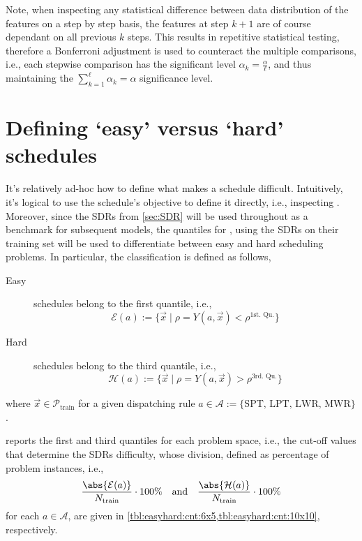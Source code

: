 Note, when inspecting any statistical difference between data distribution of the features on a step by step basis, the features at step $k+1$ are of course dependant on all previous $k$ steps. This results in repetitive statistical testing, therefore a Bonferroni adjustment is used to counteract the multiple comparisons, i.e., each stepwise comparison has the significant level $\alpha_k=\frac{\alpha}{\ell}$, and thus maintaining the $\sum_{k=1}^{\ell}\alpha_k=\alpha$ significance level.

\section{Defining `easy' versus `hard' schedules}\label{sec:diff:easyhard}
It's relatively ad-hoc how to define what makes a schedule difficult. Intuitively, it's logical to use the schedule's objective to define it directly, i.e., inspecting \fullnamerho. Moreover, since the SDRs from \cref{sec:SDR} will be used throughout as a benchmark for subsequent models, the quantiles for \namerho, using the SDRs on their training set will be used to differentiate between easy and hard scheduling problems. In particular, the classification is defined as follows, 
\begin{description}
	\item[Easy] schedules belong to the first quantile, i.e., \hfill \\
	\begin{equation}\label{eq:easy}
		\mathcal{E}(a):=\{\vec{x}\;|\;\rho=Y(a,\vec{x})<\rho^{\text{1st. Qu.}}\}
	\end{equation} 
	\item[Hard] schedules belong to the third quantile, i.e., \hfill \\
	\begin{equation}\label{eq:hard}
		\mathcal{H}(a):=\{\vec{x}\;|\;\rho=Y(a,\vec{x})>\rho^{\text{3rd. Qu.}}\}
	\end{equation} 
\end{description}
where $\vec{x}\in\mathcal{P}_{\text{train}}$ for a given dispatching rule $a\in\mathcal{A}:=\{\text{SPT,~LPT,~LWR,~MWR}\}$.

 reports the first and third quantiles for each problem space, i.e., the cut-off values that determine the SDRs difficulty, whose division, defined as percentage of problem instances, i.e., 
\begin{equation}\label{eq:easyhard:cnt}
	\frac{\abs{\mathcal{E}(a)}}{N_{\text{train}}} \cdot 100\%
	\quad \text{and} \quad 
	\frac{\abs{\mathcal{H}(a)}}{N_{\text{train}}}\cdot 100\%
\end{equation}
for each $a\in\mathcal{A}$, are given in \cref{tbl:easyhard:cnt:6x5,tbl:easyhard:cnt:10x10}, respectively. 

